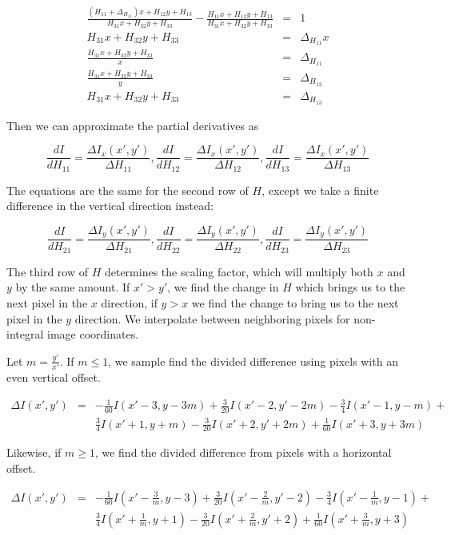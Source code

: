 \documentclass[float=false, crop=false]{standalone}
\begin{document}
\begin{eqnarray*}
	\frac{(H_{11} + \Delta_{H_{11}}) x + H_{12}y + H_{13}}{H_{31}x + H_{32}y + H_{33}} - \frac{H_{11}x + H_{12}y + H_{13}}{H_{31}x + H_{32}y + H_{33}} &=& 1\\
	H_{31}x + H_{32}y + H_{33} &=& \Delta_{H_{11}} x\\
	\frac{H_{31}x + H_{32}y + H_{33}}{x} &=& \Delta_{H_{11}}\\
	\frac{H_{31}x + H_{32}y + H_{33}}{y} &=& \Delta_{H_{12}}\\
	H_{31}x + H_{32}y + H_{33} &=& \Delta_{H_{13}}
\end{eqnarray*}

Then we can approximate the partial derivatives as

$$\frac{dI}{dH_{11}} = \frac{\Delta I_x(x', y')}{\Delta H_{11}}, 
\frac{dI}{dH_{12}} = \frac{\Delta I_x(x', y')}{\Delta H_{12}}, 
\frac{dI}{dH_{13}} = \frac{\Delta I_x(x', y')}{\Delta H_{13}}$$

The equations are the same for the second row of $H$, except we take a finite
difference in the vertical direction instead:

$$\frac{dI}{dH_{21}} = \frac{\Delta I_y(x', y')}{\Delta H_{21}}, 
\frac{dI}{dH_{22}} = \frac{\Delta I_y(x', y')}{\Delta H_{22}}, 
\frac{dI}{dH_{23}} = \frac{\Delta I_y(x', y')}{\Delta H_{23}}$$

The third row of $H$ determines the scaling factor, which will multiply both
$x$ and $y$ by the same amount. If $x'> y'$, we find the change in $H$ which
brings us to the next pixel in the $x$ direction, if $y > x$ we find the change
to bring us to the next pixel in the $y$ direction. We interpolate between
neighboring pixels for non-integral image coordinates.

Let $m = \frac{y'}{x'}$. If $m \le 1$, we sample find the divided difference using pixels
with an even vertical offset. 

\begin{eqnarray*}
	\Delta I(x', y') &=& -\frac{1}{60}I(x'-3, y-3m) + \frac{3}{20}I(x'-2, y'-2m) - \frac{3}{4} I(x'-1, y-m) +\\
			&& \frac{3}{4} I(x'+1, y+m) -\frac{3}{20}I(x'+2, y'+2m) + \frac{1}{60}I(x'+3, y+3m)
\end{eqnarray*}

Likewise, if $m \ge 1$, we find the divided difference from pixels with a horizontal offset.

\begin{eqnarray*}
	\Delta I(x', y') &=& -\frac{1}{60}I(x'-\frac{3}{m}, y-3) + \frac{3}{20}I(x'-\frac{2}{m}, y'-2) - \frac{3}{4} I(x'-\frac{1}{m}, y-1) +\\
			&& \frac{3}{4} I(x'+\frac{1}{m}, y+1) -\frac{3}{20}I(x'+\frac{2}{m}, y'+2) + \frac{1}{60}I(x'+\frac{3}{m}, y+3)
\end{eqnarray*}
\end{document}
